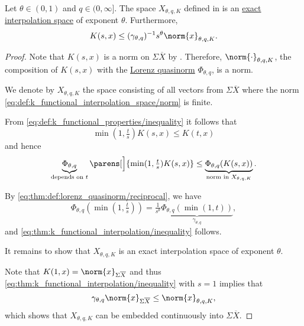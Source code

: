 \begin{theorem}\label{thm:k_functional_interpolation}
  Let \( \theta \in (0, 1) \) and \( q \in (0, \infty] \). The space \( X_{\theta,q,K} \) defined in  is an \hyperref[def:banach_interpolation_space_exponent]{exact interpolation space} of exponent \( \theta \). Furthermore,
  \begin{equation}\label{eq:thm:k_functional_interpolation/inequality}
    K(s, x) \leq (\gamma_{\theta,q})^{-1} s^\theta \norm{x}_{\theta,q,K}.
  \end{equation}
\end{theorem}
\begin{proof}
  Note that \( K(s, x) \) is a norm on \( \Sigma \overline{X} \) by . Therefore, \( \norm{\cdot}_{\theta,q,K} \), the composition of \( K(s, x) \) with the \hyperref[def:lorenz_quasinorm]{Lorenz quasinorm} \( \Phi_{\theta,q} \), is a norm.

  We denote by \( X_{\theta,q,K} \) the space consisting of all vectors from \( \Sigma \overline{X} \) where the norm \eqref{eq:def:k_functional_interpolation_space/norm} is finite.

  From \eqref{eq:def:k_functional_properties/inequality} it follows that
  \begin{equation*}
    \min(1, \tfrac t s) K(s, x) \leq K(t, x)
  \end{equation*}
  and hence
  \begin{equation*}
    \underbrace{\Phi_{\theta,q}}_{\text{depends on } t} \parens[\Big]{ \min(1, \tfrac t s) K(s, x) } \leq \underbrace{\Phi_{\theta,q}(K(s, x))}_{\text{norm in } X_{\theta,q,K}}.
  \end{equation*}

  By \eqref{eq:thm:def:lorenz_quasinorm/reciprocal}, we have
  \begin{equation*}
    \Phi_{\theta,q}(\min(1, \tfrac t s)) = \tfrac 1 {s^\theta} \underbrace{\Phi_{\theta,q}(\min(1, t))}_{\hyperref[eq:def:lorenz_quasinorm/gamma]{\gamma_{\theta,q}}},
  \end{equation*}
  and \eqref{eq:thm:k_functional_interpolation/inequality} follows.

  It remains to show that \( X_{\theta,q,K} \) is an exact interpolation space of exponent \( \theta \).

  Note that \( K(1, x) = \norm{x}_{\Sigma \overline{X}} \) and thus \eqref{eq:thm:k_functional_interpolation/inequality} with \( s = 1 \) implies that
  \begin{equation*}
    \gamma_{\theta,q} \norm{x}_{\Sigma \overline{X}} \leq \norm{x}_{\theta,q,K},
  \end{equation*}
  which shows that \( X_{\theta,q,K} \) can be embedded continuously into \( \Sigma \overline{X} \).


\end{proof}
